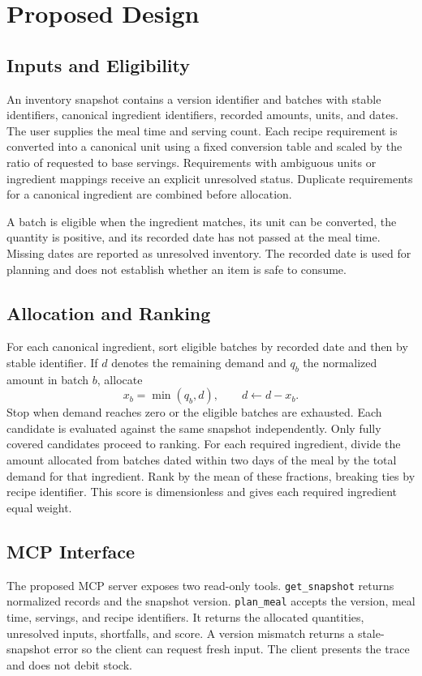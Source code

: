 \section{Proposed Design}
\subsection{Inputs and Eligibility}
An inventory snapshot contains a version identifier and batches with stable identifiers, canonical ingredient identifiers, recorded amounts, units, and dates. The user supplies the meal time and serving count. Each recipe requirement is converted into a canonical unit using a fixed conversion table and scaled by the ratio of requested to base servings. Requirements with ambiguous units or ingredient mappings receive an explicit unresolved status. Duplicate requirements for a canonical ingredient are combined before allocation.

A batch is eligible when the ingredient matches, its unit can be converted, the quantity is positive, and its recorded date has not passed at the meal time. Missing dates are reported as unresolved inventory. The recorded date is used for planning and does not establish whether an item is safe to consume.

\subsection{Allocation and Ranking}
For each canonical ingredient, sort eligible batches by recorded date and then by stable identifier. If $d$ denotes the remaining demand and $q_b$ the normalized amount in batch $b$, allocate
\begin{equation}
x_b = \min(q_b,d), \qquad d \leftarrow d-x_b.
\end{equation}
Stop when demand reaches zero or the eligible batches are exhausted. Each candidate is evaluated against the same snapshot independently. Only fully covered candidates proceed to ranking. For each required ingredient, divide the amount allocated from batches dated within two days of the meal by the total demand for that ingredient. Rank by the mean of these fractions, breaking ties by recipe identifier. This score is dimensionless and gives each required ingredient equal weight.

\subsection{MCP Interface}
The proposed MCP server exposes two read-only tools. \texttt{get\_snapshot} returns normalized records and the snapshot version. \texttt{plan\_meal} accepts the version, meal time, servings, and recipe identifiers. It returns the allocated quantities, unresolved inputs, shortfalls, and score. A version mismatch returns a stale-snapshot error so the client can request fresh input. The client presents the trace and does not debit stock.

